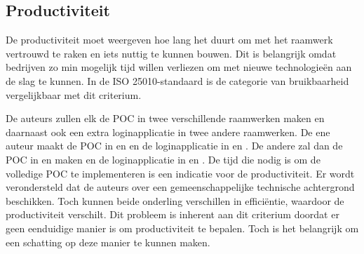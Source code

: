 \subsection{Productiviteit}
\label{sec:vergelijking-productiviteit}
De productiviteit moet weergeven hoe lang het duurt om met het raamwerk vertrouwd te raken en iets nuttig te kunnen bouwen.
Dit is belangrijk omdat bedrijven zo min mogelijk tijd willen verliezen om met nieuwe technologieën aan de slag te kunnen.
In de ISO 25010-standaard is de categorie van bruikbaarheid vergelijkbaar met dit criterium.

De auteurs zullen elk de POC in twee verschillende raamwerken maken en daarnaast ook een extra loginapplicatie in twee andere raamwerken.
De ene auteur maakt de POC in \jqm{} en \lungo{} en de loginapplicatie in \st{} en \kendo{}.
De andere zal dan de POC in \st{} en \kendo{} maken en de loginapplicatie in \jqm{} en \lungo{}.
De tijd die nodig is om de volledige POC te implementeren is een indicatie voor de productiviteit. 
Er wordt verondersteld dat de auteurs over een gemeenschappelijke technische achtergrond beschikken.
Toch kunnen beide onderling verschillen in efficiëntie,  waardoor de productiviteit verschilt.
Dit probleem is inherent aan dit criterium doordat er geen eenduidige manier is om productiviteit te bepalen.
Toch is het belangrijk om een schatting op deze manier te kunnen maken.

% 

